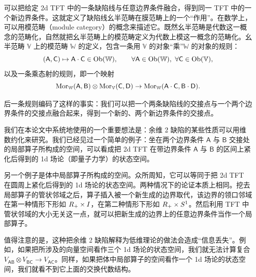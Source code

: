 可以把给定 2d TFT 中的一条缺陷线与任意边界条件融合，得到同一 TFT 中的一个新边界条件。这就定义了缺陷线幺半范畴在膜范畴上的一个“作用”。在数学上，可以用模范畴（module category）的概念来描述它。既然幺半范畴是代数这一概念的范畴化，自然就把幺半范畴上的模范畴定义为代数上模这一概念的范畴化。幺半范畴 $\mathbb{V}$ 上的模范畴 $\mathbb{W}$ 的定义，包含一条用 $\mathbb{V}$ 的对象“乘”$\mathbb{W}$ 的对象的规则：
\[
    (\mathsf{A},\mathsf{C})\mapsto\mathsf{A}\cdot\mathsf{C}\in\Ob(\mathbb{W}),\qquad
    \forall\mathsf{A}\in\Ob(\mathbb{W}),\ \forall\mathsf{C}\in\Ob(\mathbb{V}),
\]
以及一条乘态射的规则，即一个映射
\[
    \operatorname{Mor}_{\mathbb{W}}(\mathsf{A},\mathsf{B})\otimes\operatorname{Mor}_{\mathbb{V}}(\mathsf{C},\mathsf{D})\to
    \operatorname{Mor}_{\mathbb{W}}(\mathsf{A}\cdot\mathsf{C},\mathsf{B}\cdot\mathsf{D}).
\]

后一条规则编码了这样的事实：我们可以把一个两条缺陷线的交接点与一个两个边界条件的交接点融合起来，得到一个新的、两个新边界条件的交接点。


我们在本论文中系统地使用的一个重要想法是：余维 2 缺陷的某些性质可以用维数约化来研究。我们已经见过一个简单的例子：坐在两个边界条件 $\mathsf{A}$ 与 $\mathsf{B}$ 交接处的局部算子所构成的空间，可以看成把 2d TFT 在带边界条件 $\mathsf{A}$ 与 $\mathsf{B}$ 的区间上紧化后得到的 1d 场论（即量子力学）的状态空间。

另一个例子是体中局部算子所构成的空间。众所周知，它可以等同于把 2d TFT 在圆周上紧化后得到的 1d 场论的状态空间。两种情况下的论证本质上相同。挖去局部算子的管状邻域之后，算子插入被一个新生成的边界取代，该边界的领口邻域在第一种情形下形如 $R_+\times I$，在第二种情形下形如 $R_+\times S^1$。然后利用 TFT 中管状邻域的大小无关这一点，就可以把新生成的边界上的任意边界条件当作一个局部算子。


值得注意的是，这种把余维 2 缺陷解释为低维理论的做法会造成“信息丢失”。例如，如果把所涉及的向量空间看作三个 1d 场论的状态空间，我们就无法计算复合 $V_{\mathsf{A}\mathsf{B}}\otimes V_{\mathsf{B}\mathsf{C}}\to V_{\mathsf{A}\mathsf{C}}$。同样，如果把体中局部算子的空间看作一个 1d 场论的状态空间，我们就看不到它上面的交换代数结构。

